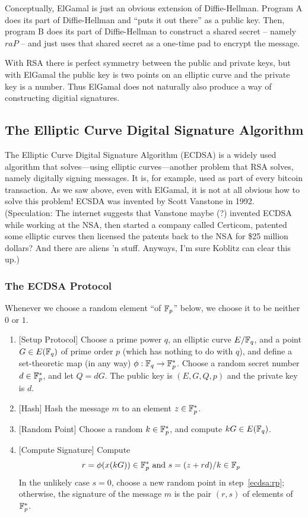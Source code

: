 \documentclass{book}
\begin{document}
Conceptually, ElGamal is just an obvious extension of Diffie-Hellman.
Program A does its part of Diffie-Hellman
and ``puts it out there'' as a public key.
Then, program B does its part of Diffie-Hellman to construct a shared
secret -- namely $raP$ -- and just uses that shared secret as a one-time
pad to encrypt the message.

With RSA there is perfect symmetry between the public and private keys, but
with ElGamal the public key is two points on an elliptic curve and the private
key is a number.  Thus ElGamal does not naturally also produce
a way of constructing digitial signatures.

\subsection{The Elliptic Curve Digital Signature Algorithm}

The Elliptic Curve Digital Signature Algorithm (ECDSA) is a widely used
algorithm that solves---using elliptic curves---another problem that RSA solves, namely
digitally signing messages.
It is, for example, used as part of every bitcoin transaction.
As we saw above, even
with ElGamal, it is not at all obvious how to solve this problem!
ECSDA was invented by Scott Vanstone in 1992. (Speculation:
The internet suggests that
Vanstone maybe (?) invented ECDSA while working at the NSA,
then started a company called Certicom, patented some elliptic curves
then licensed the patents back to the NSA for \$25 million dollars?
And there are aliens 'n stuff.  Anyways, I'm sure Koblitz can clear this up.)


\subsubsection{The ECDSA Protocol}
Whenever we choose a random element ``of $\mathbb{F}_p$'' below, we choose it to be neither $0$ or $1$.

\begin{enumerate}
\item{}[Setup Protocol]
Choose a prime power $q$, an elliptic curve $E/\mathbb{F}_q$, and a
point $G \in E(\mathbb{F}_q)$ of prime order $p$ (which has nothing to do with $q$),
and define a set-theoretic map (in any way) $\phi:\mathbb{F}_q \to \mathbb{F}_p^*$.
Choose a random secret number $d \in \mathbb{F}_p^*$,
and let $Q=dG$.
The public key is $(E,G,Q,p)$ and the private key is $d$.
\item{}[Hash] Hash the message $m$ to an element $z\in \mathbb{F}_p^*$.
\item\label{ecdsa:rp}{}[Random Point] Choose a random $k\in \mathbb{F}_p^*$, and compute $kG \in E(\mathbb{F}_q)$.
\item{}[Compute Signature] Compute
$$r=\phi(x(kG))\in \mathbb{F}_p^*\text { and }
s=(z+r d)/k \in \mathbb{F}_p$$
In the unlikely case
$s=0$, choose a new random point in step~\ref{ecdsa:rp};
otherwise, the signature of the message
$m$ is the pair $(r,s)$ of elements of $\mathbb{F}_p^*$.
\end{enumerate}
\end{document}
